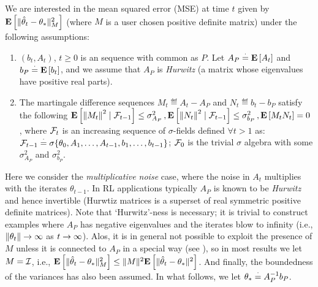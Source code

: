 We are interested in the mean squared error (MSE) at time $t$ given by $\mathbf{E}\left[\| \hat{\theta}_t-\theta_*\|^2_M\right]$ (where $M$ is a user chosen positive definite matrix) under the following assumptions:
\begin{assumption}\label{assmp:lsa}
\begin{enumerate}[leftmargin=*, before = \leavevmode\vspace{-\baselineskip}]
\item \label{dist} $(b_t, A_t)$, $t\geq 0$ is an \iid sequence with common as $P$. Let $A_P\stackrel{\cdot}{=}\mathbf{E}\left[A_t\right]$ and $b_P\stackrel{\cdot}{=}\mathbf{E}\left[b_t\right]$, and we assume that $A_P$ is \emph{Hurwitz} (a matrix whose eigenvalues have positive real parts).  
\item \label{matvar}  The martingale difference sequences $M_t\eqdef A_t-A_{P}$ and $N_t\eqdef b_t-b_{P}$ satisfy the following 
$\mathbf{E}\left[\left\| M_t\right\|^2\mid\mathcal{F}_{t-1}\right]\leq \sigma^2_{A_P}\,, \mathbf{E}\left[\left\| N_t\right\|^2\mid\mathcal{F}_{t-1}\right] \leq\sigma^2_{b_P}\,, \mathbf{E}\left[M_tN_t\right]=0$,
where $\mathcal{F}_t$ is an increasing sequence of $\sigma$-fields defined $\forall t > 1$ as: $\mathcal{F}_{t-1}\stackrel{\cdot}{=}\sigma\{\theta_0,A_1,\ldots, A_{t-1}, b_1,\ldots, b_{t-1}\}$; $\mathcal{F}_{0}$ is the trivial $\sigma$ algebra with some $\sigma^2_{A_P}$ and $\sigma^2_{b_P}$. 
\end{enumerate}
\end{assumption}
Here we consider the \emph{multiplicative noise} case, where the noise in $A_t$ multiplies with the iterates $\theta_{t-1}$. In RL applications typically $A_P$ is known to be \emph{Hurwitz} and hence invertible (Hurwtiz matrices is a superset of real symmetric positive definite matrices). Note that `Hurwitz'-ness is necessary; it is trivial to construct examples where $A_P$ has negative eigenvalues and the iterates blow to infinity (i.e., $\left\| \theta_t\right\|\rightarrow\infty$ as $t\rightarrow\infty$). Alos, it is in general not possible to exploit the presence of $M$ unless it is connected to $A_P$ in a special way (see ), so in most results we let $M = \mathcal{I}$, i.e., $\mathbf{E}\left[\| \hat{\theta}_t-\theta_*\|^2_M\right]\leq \| M\|^2\mathbf{E}\left[\| \hat{\theta}_t-\theta_*\|^2\right]$. 
And finally, the boundedness of the variances has also been assumed. In what follows, we let $\theta_*\stackrel{\cdot}{=} A_P^{-1}b_P$.
